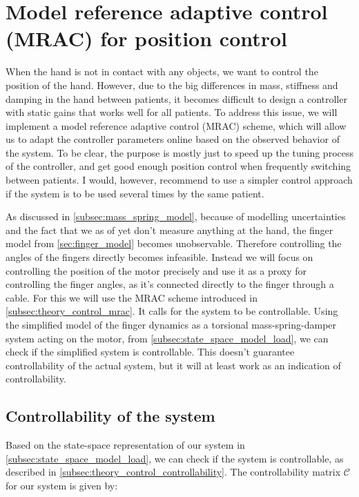\section{Model reference adaptive control (MRAC) for position control}%
\label{sec:mrac_implementation}

When the hand is not in contact with any objects, we want to control the position of the hand. However, due to the big differences in mass, stiffness and damping in the hand between patients, it becomes difficult to design a controller with static gains that works well for all patients. To address this issue, we will implement a model reference adaptive control (MRAC) scheme, which will allow us to adapt the controller parameters online based on the observed behavior of the system. To be clear, the purpose is mostly just to speed up the tuning process of the controller, and get good enough position control when frequently switching between patients. I would, however, recommend to use a simpler control approach if the system is to be used several times by the same patient. 

As discussed in \cref{subsec:mass_spring_model}, because of modelling uncertainties and the fact that we as of yet don't measure anything at the hand, the finger model from \cref{sec:finger_model} becomes unobservable. Therefore controlling the angles of the fingers directly becomes infeasible. Instead we will focus on controlling the position of the motor precisely and use it as a proxy for controlling the finger angles, as it's connected directly to the finger through a cable. For this we will use the MRAC scheme introduced in \cref{subsec:theory_control_mrac}. It calls for the system to be controllable. Using the simplified model of the finger dynamics as a torsional mass-spring-damper system acting on the motor, from \cref{subsec:state_space_model_load}, we can check if the simplified system is controllable. This doesn't guarantee controllability of the actual system, but it will at least work as an indication of controllability.

\subsection{Controllability of the system}%
\label{subsec:controllability}
Based on the state-space representation of our system in \cref{subsec:state_space_model_load}, we can check if the system is controllable, as described in \cref{subsec:theory_control_controllability}. The controllability matrix $\mathcal{C}$ for our system is given by:

